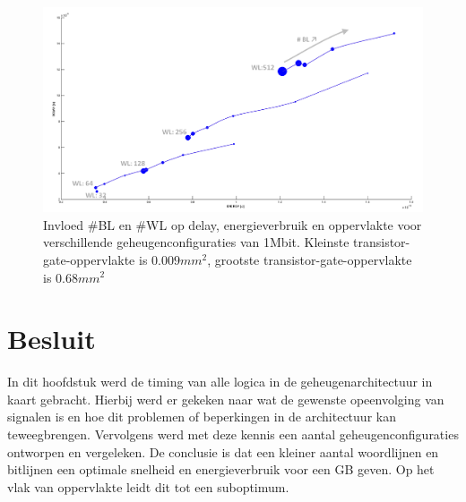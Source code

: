 \begin{figure}[!ht]
  \centering
  \includegraphics[scale=0.6]{../fig/hfdstk-timing-all-sol2.png}
  \caption[Delay, energieverbruik en oppervlakte van alle geheugenconfiguraties]{Invloed \#BL en \#WL op delay, energieverbruik en oppervlakte voor verschillende geheugenconfiguraties van 1Mbit. Kleinste transistor-gate-oppervlakte is $0.009mm^{2}$, grootste transistor-gate-oppervlakte is $0.68mm^{2}$}
  \label{fig:final20all2}
\end{figure} 

\section{Besluit}
In dit hoofdstuk werd de timing van alle logica in de geheugenarchitectuur in kaart gebracht. Hierbij werd er gekeken naar wat de gewenste opeenvolging van signalen is en hoe dit problemen of beperkingen in de architectuur kan teweegbrengen. Vervolgens werd met deze kennis een aantal geheugenconfiguraties ontworpen en vergeleken. De conclusie is dat een kleiner aantal woordlijnen en bitlijnen een optimale snelheid en energieverbruik voor een GB geven. Op het vlak van oppervlakte leidt dit tot een suboptimum.
